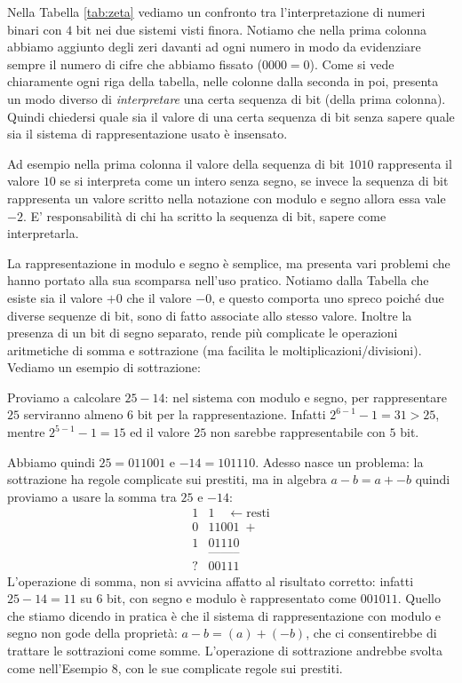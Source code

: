{\footnotesize

}


Nella Tabella \ref{tab:zeta} vediamo un confronto tra l'interpretazione di numeri binari con $4$ bit nei due sistemi visti finora. Notiamo che nella prima
colonna abbiamo aggiunto degli zeri davanti ad ogni numero in modo da
evidenziare sempre il numero di cifre che abbiamo fissato ($0000 = 0$). Come si
vede chiaramente ogni riga della tabella, nelle colonne dalla seconda in poi, presenta un modo diverso di \emph{interpretare} una certa sequenza di bit (della prima colonna). Quindi chiedersi quale sia il valore di una
certa sequenza di bit senza sapere quale sia il sistema di rappresentazione
usato è insensato.

Ad esempio nella prima colonna il valore della sequenza di bit $1010$
rappresenta il valore $10$ se si interpreta come un intero senza segno, se
invece la sequenza di bit rappresenta un valore scritto nella notazione con
modulo e segno allora essa vale $-2$. E' responsabilità di chi ha scritto la
sequenza di bit, sapere come interpretarla.

La rappresentazione in modulo e segno è semplice, ma presenta vari problemi che
hanno portato alla sua scomparsa nell'uso pratico. Notiamo dalla Tabella che
esiste sia il valore $+0$ che il valore $-0$, e questo comporta uno spreco
poiché due diverse sequenze di bit, sono di fatto associate allo stesso valore.
Inoltre la presenza di un bit di segno separato, rende più complicate le
operazioni aritmetiche di somma e sottrazione (ma facilita le
moltiplicazioni/divisioni). Vediamo un esempio di sottrazione:

\begin{ex} Proviamo a calcolare $25 - 14$: nel sistema con modulo e segno, per rappresentare $25$ serviranno almeno $6$ bit per la rappresentazione. Infatti $2^{6-1}-1 = 31 > 25$, mentre $2^{5-1}-1 = 15$ ed il valore $25$ non sarebbe rappresentabile con $5$ bit.

Abbiamo quindi $25 = 011001$ e  $-14 = 101110$. Adesso nasce un problema:
la sottrazione ha regole complicate sui prestiti, ma in algebra $a-b = a+ -b$ quindi proviamo a usare la somma tra $25$ e $-14$:
\begin{align*}
	    1&1 \quad \leftarrow\text{resti}\\
	    0&11001 \;+\\
	    1&01110\\[-0.5ex]
      &\text{--------}\\[-0.5ex]
	    ?&00111
\end{align*} L'operazione di somma, non si avvicina affatto
al risultato corretto: infatti $25-14=11$ su $6$ bit, con segno e modulo è rappresentato come $001011$. Quello che stiamo dicendo in pratica è che
il sistema di rappresentazione con modulo e segno non gode della proprietà: $a-b = (a)+(-b)$, che ci consentirebbe di trattare le sottrazioni come somme.
L'operazione di sottrazione andrebbe svolta come nell'Esempio 8, con le sue complicate regole sui prestiti.
\end{ex}

